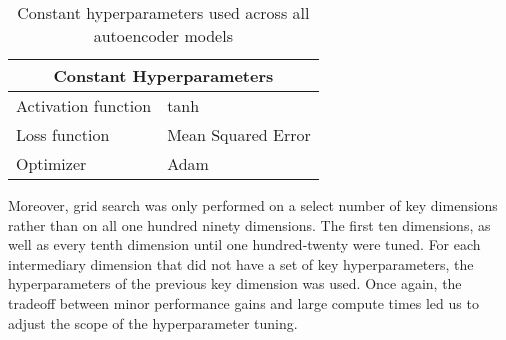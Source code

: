 \documentclass{article}
\begin{document}
\begin{table}[h!]
\begin{center}
    \caption{Constant hyperparameters used across all autoencoder models}
    \label{tab:table1}
    \vspace{0.1cm}
    \begin{tabular}{p{4cm}p{7cm}}
        \hline
        \multicolumn{2}{c}{Constant Hyperparameters}\\
        \hline
        Activation function & tanh\\
        Loss function & Mean Squared Error  \\
        Optimizer & Adam \\
        \hline
    \end{tabular}
\end{center}
\end{table}
Moreover, grid search was only performed on a select number of key dimensions rather than on all one hundred ninety dimensions. The first ten dimensions, as well as every tenth dimension until one hundred-twenty were tuned. For each intermediary dimension that did not have a set of key hyperparameters, the hyperparameters of the previous key dimension was used. Once again, the tradeoff between minor performance gains and large compute times led us to adjust the scope of the  hyperparameter tuning.
\end{document}
